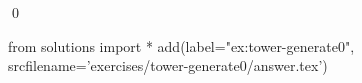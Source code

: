 
\begin{ex} 
  \label{ex:tower-generate0}
  
  \qed
\end{ex} 
\begin{python0}
from solutions import *
add(label="ex:tower-generate0",
    srcfilename='exercises/tower-generate0/answer.tex') 
\end{python0}
